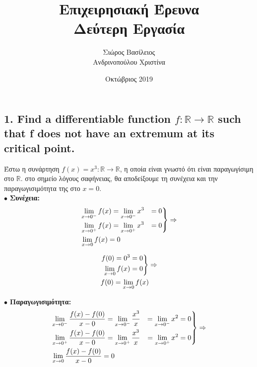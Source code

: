 \documentclass[12pt]{article}
\title{\hugeΑλγοριθμική Επιχειρησιακή Έρευνα\\Δεύτερη Εργασία}
\author{Σιώρος Βασίλειος\\Ανδρινοπούλου Χριστίνα}
\date{Οκτώβριος 2019}
\newcommand{\R}{\mathbb{R}}
\newenvironment{rcases}
	{\left.\begin{aligned}}
	{\end{aligned}\right\rbrace}
\begin{document}
\maketitle


\pagebreak


\subsection*{1. Find a differentiable function \( f: \R \rightarrow \R \) such that f does not have an extremum at its
critical point.}

Έστω η συνάρτηση \( f(x) = x^3 : \R \rightarrow \R \), η οποία είναι γνωστό ότι είναι
παραγωγίσιμη στο \( \R \). στο σημείο λόγους σαφήνειας, θα αποδείξουμε τη συνέχεια και την παραγωγισιμότητα της
στο \( x = 0 \). \\

\( \bullet \) \textbf{Συνέχεια:} \\

\begin{align*}
    &\begin{rcases}
        \lim_{x \to 0^-} f(x) & = \lim_{x \to 0^-} x^3 & = 0 \\
        \lim_{x \to 0^+} f(x) & = \lim_{x \to 0^+} x^3 & = 0
    \end{rcases}
    \Rightarrow \\
    &\lim_{x \to 0} f(x) = 0
\end{align*}

\begin{align*}
    &\begin{rcases}
        f(0) = 0^3 & = 0 \\
        \lim_{x \to 0} f(x) & = 0
    \end{rcases}
    \Rightarrow \\
    &f(0) = \lim_{x \to 0} f(x)
\end{align*}

\( \bullet \) \textbf{Παραγωγισιμότητα:} \\

\begin{align*}
    &\begin{rcases}
        \lim_{x \to 0^-} \frac{f(x) - f(0)}{x - 0} &= \lim_{x \to 0^-} \frac{x^3}{x} &= \lim_{x \to 0^-} x^2 &= 0 \\
        \lim_{x \to 0^+} \frac{f(x) - f(0)}{x - 0} &= \lim_{x \to 0^+} \frac{x^3}{x} &= \lim_{x \to 0^+} x^2 &= 0
    \end{rcases}
    \Rightarrow \\
    &\lim_{x \to 0} \frac{f(x) - f(0)}{x - 0} = 0
\end{align*} \\
\end{document}
